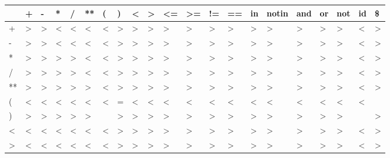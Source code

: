 \begin{tabular}{|l|l|l|l|l|l|l|l|l|l|l|l|l|l|l|l|l|l|l|l|l|}
\hline
&+&-&*&/&**&(&)&\textless&\textgreater&\textless=&\textgreater=&!=& ==&in&notin&and&or&not&id&\$\\
\hline
+&\textgreater&\textgreater&\textless&\textless&\textless&\textless&\textgreater&\textgreater&\textgreater&\textgreater&\textgreater&\textgreater&\textgreater&\textgreater&\textgreater&\textgreater&\textgreater&\textgreater&\textless&\textgreater\\
\hline
-&\textgreater&\textgreater&\textless&\textless&\textless&\textless&\textgreater&\textgreater&\textgreater&\textgreater&\textgreater&\textgreater&\textgreater&\textgreater&\textgreater&\textgreater&\textgreater&\textgreater&\textless&\textgreater\\
\hline
*&\textgreater&\textgreater&\textgreater&\textgreater&\textless&\textless&\textgreater&\textgreater&\textgreater&\textgreater&\textgreater&\textgreater&\textgreater&\textgreater&\textgreater&\textgreater&\textgreater&\textgreater&\textless&\textgreater\\
\hline
/&\textgreater&\textgreater&\textgreater&\textgreater&\textless&\textless&\textgreater&\textgreater&\textgreater&\textgreater&\textgreater&\textgreater&\textgreater&\textgreater&\textgreater&\textgreater&\textgreater&\textgreater&\textless&\textgreater\\
\hline
**&\textgreater&\textgreater&\textgreater&\textgreater&\textgreater&\textless&\textgreater&\textgreater&\textgreater&\textgreater&\textgreater&\textgreater&\textgreater&\textgreater&\textgreater&\textgreater&\textgreater&\textgreater&\textless&\textgreater\\
\hline
(&\textless&\textless&\textless&\textless&\textless&\textless&=&\textless&\textless&\textless&\textless&\textless&\textless&\textless&\textless&\textless&\textless&\textless&\textless&\\
\hline
)&\textgreater&\textgreater&\textgreater&\textgreater&\textgreater&&\textgreater&\textgreater&\textgreater&\textgreater&\textgreater&\textgreater&\textgreater&\textgreater&\textgreater&\textgreater&\textgreater&\textgreater&&\textgreater\\
\hline
\textless&\textless&\textless&\textless&\textless&\textless&\textless&\textgreater&\textgreater&\textgreater&\textgreater&\textgreater&\textgreater&\textgreater&\textgreater&\textgreater&\textgreater&\textgreater&\textgreater&\textless&\textgreater\\
\hline
\textgreater&\textless&\textless&\textless&\textless&\textless&\textless&\textgreater&\textgreater&\textgreater&\textgreater&\textgreater&\textgreater&\textgreater&\textgreater&\textgreater&\textgreater&\textgreater&\textgreater&\textless&\textgreater\\

\end{tabular}
